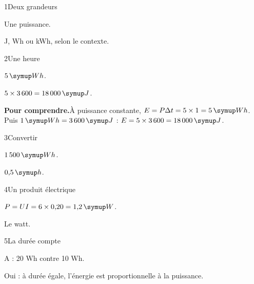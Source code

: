 \par\noindent\begin{minipage}{\linewidth}
\begin{corrige}{1}{Deux grandeurs}
\begin{questions}
\item Une puissance.
\item J, Wh ou kWh, selon le contexte.
\end{questions}
\end{corrige}
\end{minipage}
\par\noindent\begin{minipage}{\linewidth}
\begin{corrige}{2}{Une heure}
\begin{questions}
\item $5\unite{Wh}$.
\item $5\times3\,600=18\,000\unite J$.
\end{questions}
\par\smallskip\noindent\textbf{Pour comprendre.}\enspace À puissance constante, $E=P\Delta t=5\times1=5\unite{Wh}$. Puis $1\unite{Wh}=3\,600\unite J$ : $E=5\times3\,600=18\,000\unite J$.\par
\end{corrige}
\end{minipage}
\par\noindent\begin{minipage}{\linewidth}
\begin{corrige}{3}{Convertir}
\begin{questions}
\item $1\,500\unite{Wh}$.
\item $0{,}5\unite h$.
\end{questions}
\end{corrige}
\end{minipage}
\par\noindent\begin{minipage}{\linewidth}
\begin{corrige}{4}{Un produit électrique}
\begin{questions}
\item $P=UI=6\times0{,}20=1{,}2\unite W$.
\item Le watt.
\end{questions}
\end{corrige}
\end{minipage}
\par\noindent\begin{minipage}{\linewidth}
\begin{corrige}{5}{La durée compte}
\begin{questions}
\item A : 20 Wh contre 10 Wh.
\item Oui : à durée égale, l’énergie est proportionnelle à la puissance.
\end{questions}
\end{corrige}
\end{minipage}
